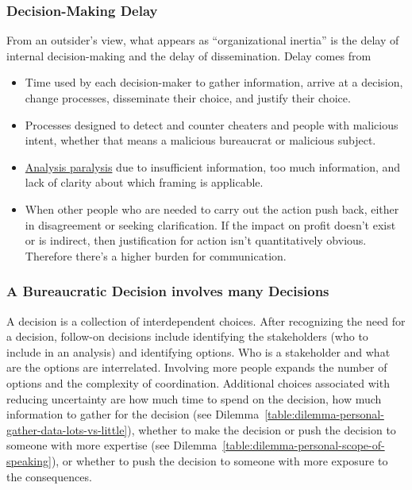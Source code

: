 \subsubsection{Decision-Making Delay\label{sec:decision-delay}}

From an outsider's view, what appears as ``organizational inertia'' is the delay of internal decision-making and the delay of dissemination. 
Delay comes from
\begin{itemize}
    \item Time used by each decision-maker to gather information, arrive at a decision, change processes, disseminate their choice, and justify their choice. 
    \item Processes designed to detect and counter cheaters and people with malicious intent, whether that means a malicious bureaucrat or malicious subject. 
\item \href{https://en.wikipedia.org/wiki/Analysis_paralysis}{Analysis paralysis} 
due to insufficient information, too much information, and lack of clarity about which framing is applicable.
\item When other people who are needed to carry out the action push back, either in disagreement or seeking clarification. If the impact on profit doesn't exist or is indirect, then justification for action isn't quantitatively obvious. Therefore there's a higher burden for communication.
\end{itemize}




\subsubsection{A Bureaucratic Decision involves many Decisions}

A decision is a collection of interdependent choices. After recognizing the need for a decision, follow-on decisions include identifying the stakeholders (who to include in an analysis) and identifying options. Who is a stakeholder and what are the options are interrelated. Involving more people expands the number of options and the complexity of coordination. Additional choices associated with reducing uncertainty are how much time to spend on the decision, how much information to gather for the decision (see Dilemma~\ref{table:dilemma-personal-gather-data-lots-vs-little}),
whether to make the decision or push the decision to someone with more expertise (see Dilemma~\ref{table:dilemma-personal-scope-of-speaking}), or whether to push the decision to someone with more exposure to the consequences.


